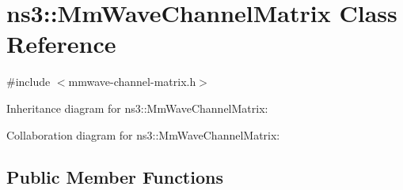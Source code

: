 \hypertarget{classns3_1_1MmWaveChannelMatrix}{}\section{ns3\+:\+:Mm\+Wave\+Channel\+Matrix Class Reference}
\label{classns3_1_1MmWaveChannelMatrix}


{\ttfamily \#include $<$mmwave-\/channel-\/matrix.\+h$>$}



Inheritance diagram for ns3\+:\+:Mm\+Wave\+Channel\+Matrix\+:


Collaboration diagram for ns3\+:\+:Mm\+Wave\+Channel\+Matrix\+:
\subsection*{Public Member Functions}
